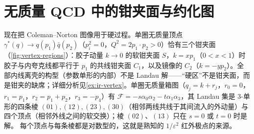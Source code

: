 \section{无质量 QCD 中的钳夹面与约化图}\label{sec:ir-pinch}

现在把 Coleman--Norton 图像用于硬过程。单圈无质量顶点 $\gamma^*(q)\to q(p_1)\bar q(p_2)$（$p_i^2=0$，$Q^2=2p_1\cdot p_2>0$）恰有三个钳夹面（\cref{fig:vertex-regions}）：胶子动量 $k\to0$ 的软钳夹面 $S$，$k=xp_1$（$0<x<1$）时胶子与内夸克线都平行于 $p_1$ 的共线钳夹面 $C_1$，以及镜像的 $C_2$（$k=-yp_2$）。全部内线离壳的构型（参数单形的内部）不是 Landau 解——“硬区”不是钳夹面，而是钳夹的缺席；详细分析见\cref{ex:ir-vertex}。单圈无质量箱图（$q_j=k+r_j$，$r_0=0$，$r_1=p_1$，$r_2=p_1+p_2$，$r_3=-p_4$）有 $\mathcal F=-s\alpha_0\alpha_2-t\alpha_1\alpha_3$，其 Landau 集是 3-单形的四条棱 $(01),(12),(23),(30)$（相邻两线共线于其间流入的外动量）与四个顶点（相邻外线之间的软交换）；棱 $(02)$、$(13)$ 只在 $s=0$ 或 $t=0$ 时是解。%
每个顶点与每条棱都是对数型的，这就是熟知的 $1/\varepsilon^2$ 红外极点的来源。


